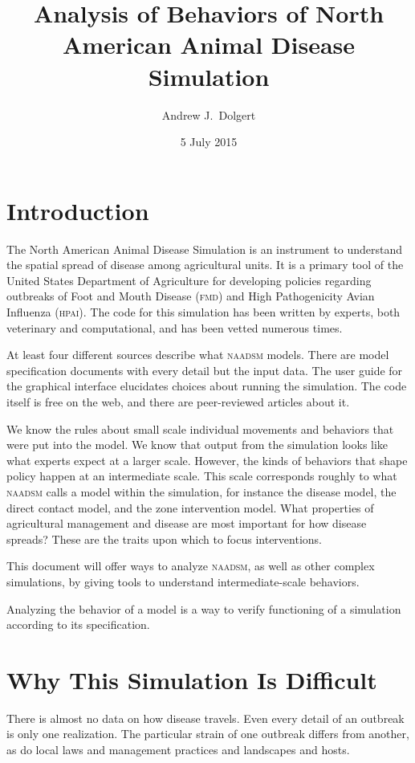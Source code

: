 \documentclass{article}
\title{Analysis of Behaviors of North American Animal Disease Simulation}
\author{Andrew J.\ Dolgert}
\date{5 July 2015}
\newcommand{\naadsm}{\textsc{naadsm}\xspace}
\begin{document}
\maketitle

\section{Introduction}
The North American Animal Disease Simulation is an instrument to
understand the spatial spread of disease among agricultural units.
It is a primary tool of the United States Department of Agriculture
for developing policies regarding outbreaks of Foot and Mouth Disease
(\textsc{fmd}) and High Pathogenicity Avian Influenza (\textsc{hpai}).
The code for this simulation has been written by experts, both
veterinary and computational, and has been vetted numerous times.

At least four different sources describe what \naadsm models.
There are model specification documents with every detail but
the input data. The user guide for the graphical interface
elucidates choices about running the simulation. The code itself
is free on the web, and there are peer-reviewed articles about it.

We know the rules about small scale individual movements and behaviors that
were put into the model. We know that output from the simulation
looks like what experts expect at a larger scale.
However, the kinds of behaviors that shape policy happen at
an intermediate scale. This scale corresponds roughly to
what \naadsm calls a model within the simulation, for instance
the disease model, the direct contact model,
and the zone intervention model. What properties of agricultural
management and disease are most important for how disease spreads?
These are the traits upon which to focus interventions.

This document will offer ways to analyze \naadsm, as well
as other complex simulations, by giving tools to understand
intermediate-scale behaviors.

Analyzing the behavior of a model is a way to verify
functioning of a simulation according to its specification.


\section{Why This Simulation Is Difficult}

There is almost no data on how disease travels.
Even every detail of an outbreak is only one realization.
The particular strain of one outbreak differs from another,
as do local laws and management practices and landscapes
and hosts.
\end{document}
